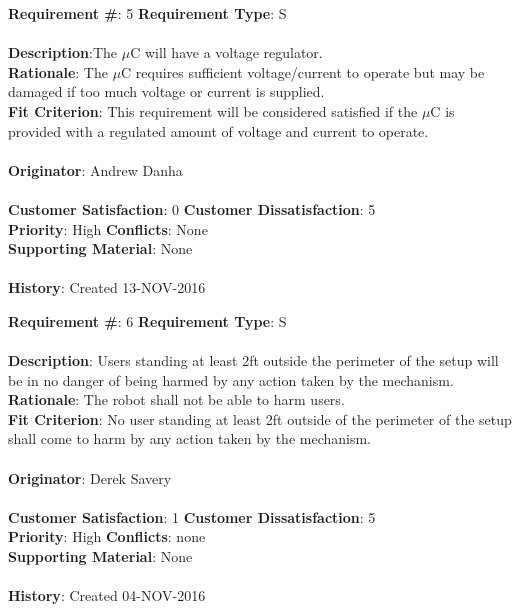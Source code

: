 \documentclass[titlepage]{article}
\begin{document}
\begin{framed}
	\noindent\textbf{Requirement \#}: 5 \hfill \textbf{Requirement Type}: S \hfill\\\\
	\noindent\textbf{Description}:The $\mu$C will have a voltage regulator.\\
	\textbf{Rationale}: The $\mu$C requires sufficient voltage/current to operate but may be damaged if too much voltage or current is supplied.\\
	\textbf{Fit Criterion}: This requirement will be considered satisfied if the $\mu$C is provided with a regulated amount of voltage and current to operate.\\\\
	\textbf{Originator}: Andrew Danha\\\\ 
	\noindent\textbf{Customer Satisfaction}: 0 \hfill 	\textbf{Customer Dissatisfaction}: 5 \hfill\\
	\textbf{Priority}: High \hfill \textbf{Conflicts}: None \hfill\\
	\textbf{Supporting Material}: None\\\\
	\noindent\textbf{History}: Created 13-NOV-2016
\end{framed}

\begin{framed}
	\noindent\textbf{Requirement \#}: 6 \hfill \textbf{Requirement Type}: S \hfill\\\\
	\noindent\textbf{Description}: Users standing at least 2ft outside the perimeter of the setup will be in no danger of being harmed by any action taken by the mechanism.\\
	\textbf{Rationale}: The robot shall not be able to harm users.\\
	\textbf{Fit Criterion}: No user standing at least 2ft outside of the perimeter of the setup shall come to harm by any action taken by the mechanism.\\\\
	\textbf{Originator}: Derek Savery\\\\
	\noindent\textbf{Customer Satisfaction}: 1 \hfill 	\textbf{Customer Dissatisfaction}: 5 \hfill\\
	\textbf{Priority}: High \hfill \textbf{Conflicts}: none \hfill\\
	\textbf{Supporting Material}: None\\\\
	\noindent\textbf{History}: Created 04-NOV-2016
\end{framed}
\newpage
\end{document}
